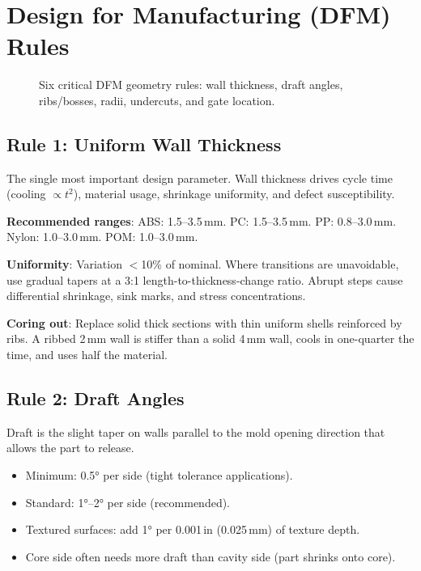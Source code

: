 \section{Design for Manufacturing (DFM) Rules}
\label{sec:dfm}

\begin{figure}[htbp]
\centering

\caption{Six critical DFM geometry rules: wall thickness, draft angles, ribs/bosses, radii, undercuts, and gate location.}
\label{fig:dfm}
\end{figure}

\subsection{Rule 1: Uniform Wall Thickness}

The single most important design parameter. Wall thickness drives cycle time (cooling $\propto t^2$), material usage, shrinkage uniformity, and defect susceptibility.

\textbf{Recommended ranges}: ABS: 1.5--3.5\,mm. PC: 1.5--3.5\,mm. PP: 0.8--3.0\,mm. Nylon: 1.0--3.0\,mm. POM: 1.0--3.0\,mm.

\textbf{Uniformity}: Variation $<$10\% of nominal. Where transitions are unavoidable, use gradual tapers at a 3:1 length-to-thickness-change ratio. Abrupt steps cause differential shrinkage, sink marks, and stress concentrations.

\textbf{Coring out}: Replace solid thick sections with thin uniform shells reinforced by ribs. A ribbed 2\,mm wall is stiffer than a solid 4\,mm wall, cools in one-quarter the time, and uses half the material.

\subsection{Rule 2: Draft Angles}

Draft is the slight taper on walls parallel to the mold opening direction that allows the part to release.

\begin{itemize}[nosep,leftmargin=1.5em]
  \item Minimum: \ang{0.5} per side (tight tolerance applications).
  \item Standard: \ang{1}--\ang{2} per side (recommended).
  \item Textured surfaces: add \ang{1} per 0.001\,in (0.025\,mm) of texture depth.
  \item Core side often needs more draft than cavity side (part shrinks onto core).
\end{itemize}

